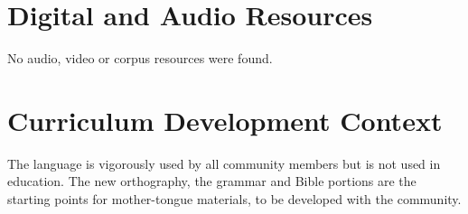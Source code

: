 \documentclass[12pt]{article}
\begin{document}
\section{Digital and Audio Resources}
No audio, video or corpus resources were found.

\section{Curriculum Development Context}
The language is vigorously used by all community members but is not used in education. The new orthography, the grammar and Bible portions are the starting points for mother-tongue materials, to be developed with the community.
\end{document}
